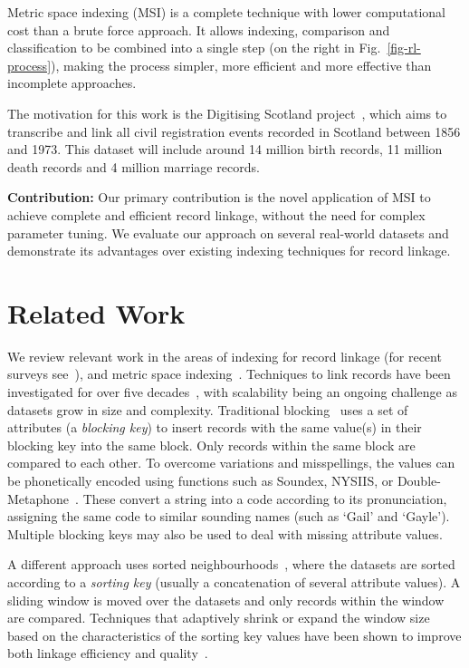 \documentclass{llncs}
\begin{document}
Metric space indexing (MSI) is a complete technique with lower
computational cost than a brute force approach. It allows indexing,
comparison and classification to be combined into a single step (on the
right in Fig.~\ref{fig-rl-process}), making the process simpler, more
efficient and more effective than incomplete approaches.

The motivation for this work is the Digitising Scotland
project~\cite{Dibben2012}, which aims to transcribe and link all civil
registration events recorded in Scotland between 1856 and 1973. This
dataset will include around 14 million birth records, 11 million death
records and 4 million marriage records.

\smallskip
\textbf{Contribution:} Our primary contribution is the novel application
of MSI to achieve complete and efficient record linkage, without the
need for complex parameter tuning. We evaluate our approach on several
real-world datasets and demonstrate its advantages over existing
indexing techniques for record linkage.

\section{Related Work}
\label{sec-related}

We review relevant work in the areas of indexing for record linkage (for
recent surveys see~\cite{Chr12b,Pap16}), and metric space
indexing~\cite{Zezula2010}. Techniques to link records have been
investigated for over five decades~\cite{Fel69,New59}, with scalability
being an ongoing challenge as datasets grow in size and complexity.
Traditional blocking~\cite{Chr12b} uses a set of attributes (a
\emph{blocking key}) to insert records with the same value(s) in their
blocking key into the same block. Only records within the same block are
 compared to each other. To overcome variations and misspellings, the
values can be phonetically encoded using functions such as Soundex,
NYSIIS, or Double-Metaphone~\cite{Chr12}. These convert a string into a
code according to its pronunciation, assigning the same code to similar
sounding names (such as `Gail' and `Gayle'). Multiple blocking keys may
also be used to deal with missing attribute values.

A different approach uses sorted neighbourhoods~\cite{Mon96}, where the
datasets are sorted according to a \emph{sorting key} (usually a
concatenation of several attribute values). A sliding window is moved
over the datasets and only records within the window are compared.
Techniques that adaptively shrink or expand the window size based on the
characteristics of the sorting key values have been shown to improve
both linkage efficiency and quality~\cite{Dra12}.
\end{document}
